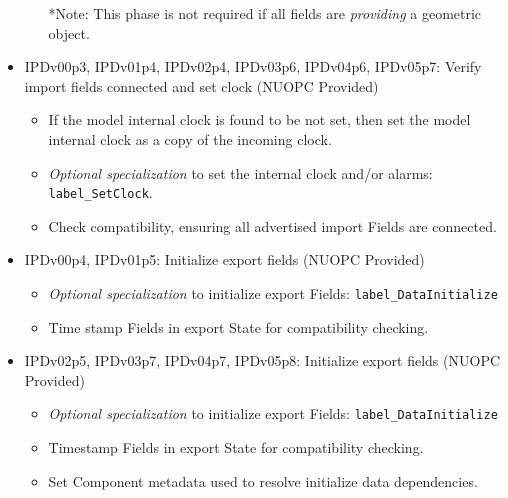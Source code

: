 \begin{itemize}
\begin{itemize}
  *Note: This phase is not required if all fields are {\em providing} a geometric object.
  \end{itemize}
\item IPDv00p3, IPDv01p4, IPDv02p4, IPDv03p6, IPDv04p6, IPDv05p7: Verify import fields connected and set clock ({\sc NUOPC Provided})
  \begin{itemize}
  \item If the model internal clock is found to be not set, then set the model internal clock as a copy of the incoming clock. 
  \item {\it Optional specialization} to set the internal clock and/or alarms: {\tt label\_SetClock}.
  \item Check compatibility, ensuring all advertised import Fields are connected.
  \end{itemize}   
\item IPDv00p4, IPDv01p5:  Initialize export fields ({\sc NUOPC Provided})
  \begin{itemize}
  \item {\it Optional specialization} to initialize export Fields: {\tt label\_DataInitialize}
  \item Time stamp Fields in export State for compatibility checking.
  \end{itemize}    
\item IPDv02p5, IPDv03p7, IPDv04p7, IPDv05p8: Initialize export fields ({\sc NUOPC Provided})
  \begin{itemize}
  \item {\it Optional specialization} to initialize export Fields: {\tt label\_DataInitialize}
  \item Timestamp Fields in export State for compatibility checking.
  \item Set Component metadata used to resolve initialize data dependencies.
  \end{itemize}    
\end{itemize}

